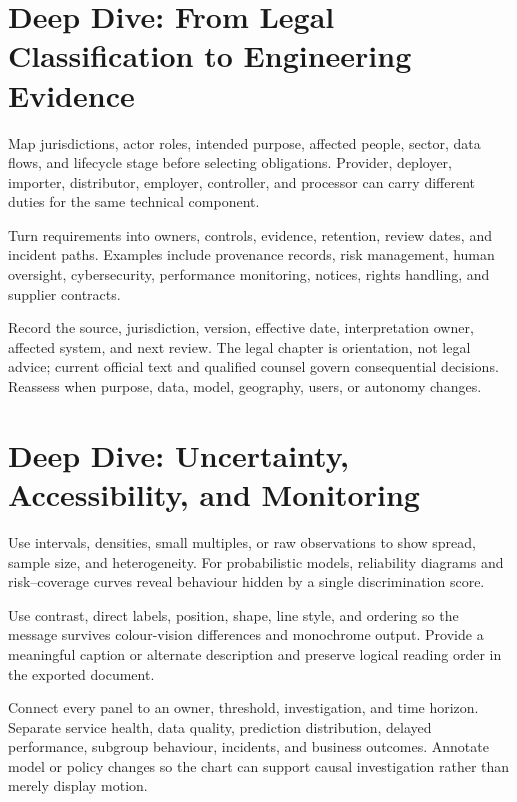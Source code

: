 \expandafter\def\csname almanachdeepdive@it-law\endcsname{%
\section{Deep Dive: From Legal Classification to Engineering Evidence}
\begin{tcbitemize}[skin=sectionraster]
\tcbitem[title={Begin with Role and Intended Purpose},raster multicolumn=3]
Map jurisdictions, actor roles, intended purpose, affected people, sector,
data flows, and lifecycle stage before selecting obligations.
Provider, deployer, importer, distributor, employer, controller, and processor
can carry different duties for the same technical component.

\tcbitem[title={Translate Duties into Controls},raster multicolumn=3]
Turn requirements into owners, controls, evidence, retention, review dates, and
incident paths.
Examples include provenance records, risk management, human oversight,
cybersecurity, performance monitoring, notices, rights handling, and supplier
contracts.

\tcbitem[title={Maintain a Legal Change Log},raster multicolumn=6]
Record the source, jurisdiction, version, effective date, interpretation owner,
affected system, and next review.
The legal chapter is orientation, not legal advice; current official text and
qualified counsel govern consequential decisions.
Reassess when purpose, data, model, geography, users, or autonomy changes.
\end{tcbitemize}
}

\expandafter\def\csname almanachdeepdive@visualization\endcsname{%
\section{Deep Dive: Uncertainty, Accessibility, and Monitoring}
\begin{tcbitemize}[skin=sectionraster]
\tcbitem[title={Show the Distribution Behind the Mean},raster multicolumn=3]
Use intervals, densities, small multiples, or raw observations to show spread,
sample size, and heterogeneity.
For probabilistic models, reliability diagrams and risk--coverage curves reveal
behaviour hidden by a single discrimination score.

\tcbitem[title={Design Beyond Colour},raster multicolumn=3]
Use contrast, direct labels, position, shape, line style, and ordering so the
message survives colour-vision differences and monochrome output.
Provide a meaningful caption or alternate description and preserve logical
reading order in the exported document.

\tcbitem[title={A Monitoring Chart Must Trigger Action},raster multicolumn=6]
Connect every panel to an owner, threshold, investigation, and time horizon.
Separate service health, data quality, prediction distribution, delayed
performance, subgroup behaviour, incidents, and business outcomes.
Annotate model or policy changes so the chart can support causal investigation
rather than merely display motion.
\end{tcbitemize}
}

